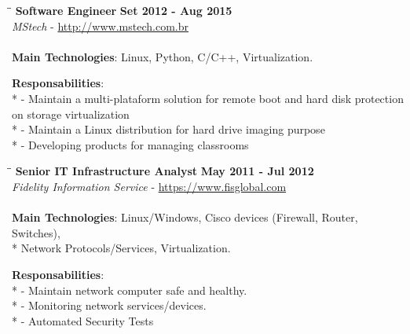 \documentclass[margin]{res}
\begin{document}
\begin{resume}
\vspace{-0.1in}
\begin{tabbing}
  \hspace{2.3in}\= \hspace{1.7in}\= \kill %
  \textbf{Software Engineer}    \>\>\textbf{Set 2012 - Aug 2015}\\
  \textit{MStech} - \url{http://www.mstech.com.br}\\\\
  \textbf{Main Technologies}: Linux, Python, C/C++, Virtualization.
\end{tabbing}\vspace{-20pt}      %
\vspace{2mm}\textbf{Responsabilities}: \\*
  - Maintain a multi-plataform solution for remote boot and hard disk protection
on storage virtualization \\*
  - Maintain a Linux distribution for hard drive imaging purpose \\*
  - Developing products for managing classrooms\\

\vspace{-0.1in}
\begin{tabbing}
  \hspace{2.3in}\= \hspace{1.7in}\= \kill %
  \textbf{Senior IT Infrastructure Analyst}    \>\>\textbf{May 2011 - Jul 2012}\\
  \textit{Fidelity Information Service} - \url{https://www.fisglobal.com}\\\\
  \textbf{Main Technologies}: Linux/Windows, Cisco devices (Firewall, Router, Switches),\\* 
  Network Protocols/Services, Virtualization.
\end{tabbing}\vspace{-20pt}      %
\vspace{2mm}\textbf{Responsabilities}: \\*
  - Maintain network computer safe and healthy. \\*
  - Monitoring network services/devices. \\*
  - Automated Security Tests\\


\end{resume}
\end{document}
